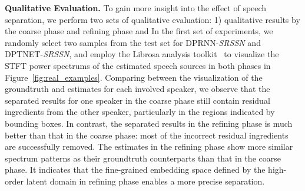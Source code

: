 








\smallskip\noindent\textbf{Qualitative Evaluation.} To gain more insight into the effect of speech separation, we perform two sets of qualitative evaluation: 1) qualitative results by the coarse phase and refining phase and  In the first set of experiments, we randomly select two samples from the test set for DPRNN-\emph{SRSSN} and DPTNET-\emph{SRSSN}, and employ the Librosa analysis toolkit~\cite{librosa} to visualize the STFT power spectrums of the estimated speech sources in both phases in Figure~\ref{fig:real_examples}. Comparing between the visualization of the groundtruth and estimates for each involved speaker, we observe that the separated results for one speaker in the coarse phase still contain residual ingredients from the other speaker, particularly in the regions indicated by bounding boxes. 
In contrast, the separated results in the refining phase is much better than that in the coarse phase: most of the incorrect residual ingredients are successfully removed. 
The estimates in the refining phase show more similar spectrum patterns as their groundtruth counterparts than that in the coarse phase. It indicates that the fine-grained embedding space defined by the high-order latent domain in refining phase enables a more precise separation.







